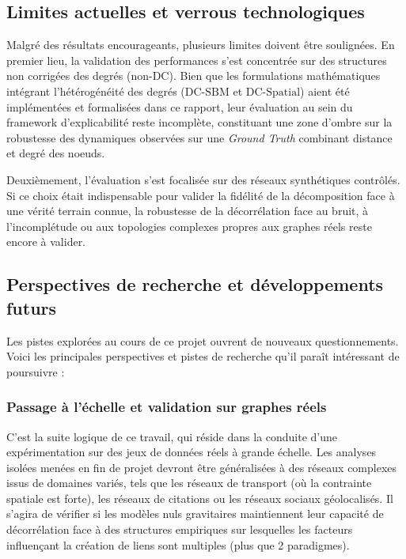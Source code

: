 \subsection{Limites actuelles et verrous technologiques}

Malgré des résultats encourageants, plusieurs limites doivent être soulignées. En premier lieu, la validation des performances s'est concentrée sur des structures non corrigées des degrés ($\text{non-DC}$). Bien que les formulations mathématiques intégrant l'hétérogénéité des degrés ($\text{DC-SBM}$ et $\text{DC-Spatial}$) aient été implémentées et formalisées dans ce rapport, leur évaluation au sein du framework d'explicabilité reste incomplète, constituant une zone d'ombre sur la robustesse des dynamiques observées sur une \textit{Ground Truth} combinant distance et degré des noeuds.

Deuxièmement, l'évaluation s'est focalisée sur des réseaux synthétiques contrôlés. Si ce choix était indispensable pour valider la fidélité de la décomposition face à une vérité terrain connue, la robustesse de la décorrélation face au bruit, à l'incomplétude ou aux topologies complexes propres aux graphes réels reste encore à valider.

\subsection{Perspectives de recherche et développements futurs}

Les pistes explorées au cours de ce projet ouvrent de nouveaux questionnements. Voici les principales perspectives et pistes de recherche qu'il paraît intéressant de poursuivre : 

\subsubsection{Passage à l'échelle et validation sur graphes réels}
C'est la suite logique de ce travail, qui réside dans la conduite d'une expérimentation sur des jeux de données réels à grande échelle. Les analyses isolées menées en fin de projet devront être généralisées à des réseaux complexes issus de domaines variés, tels que les réseaux de transport (où la contrainte spatiale est forte), les réseaux de citations ou les réseaux sociaux géolocalisés. Il s'agira de vérifier si les modèles nuls gravitaires maintiennent leur capacité de décorrélation face à des structures empiriques sur lesquelles les facteurs influençant la création de liens sont multiples (plus que 2 paradigmes).

